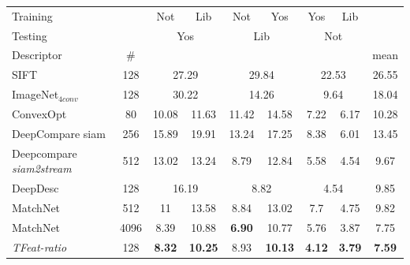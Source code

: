 \begin{table}[ht]
\begin{tabular}{lcccccccc}
\toprule 
    Training& & Not & Lib & Not  & Yos & Yos
  & Lib  & \\
    Testing&  &
                \multicolumn{2}{c}{Yos} & \multicolumn{2}{c}{Lib} & \multicolumn{2}{c}{Not} \\
    \midrule
    Descriptor & \# & & & & & & &mean  \\
    \midrule
    {\small SIFT} \cite{Lowe:2004:DIF:993451.996342} & 128 & \multicolumn{2}{c}{27.29} & \multicolumn{2}{c}{29.84}
                                    & \multicolumn{2}{c}{22.53} &
                                                                  26.55
  \\
   {\small ImageNet$_{4conv}$} \cite{FDB14} & 128 & \multicolumn{2}{c}{30.22} & \multicolumn{2}{c}{14.26}
                                    & \multicolumn{2}{c}{9.64} & 18.04
                                                                   \\
    {\small ConvexOpt} \cite{simonyan2014learning} & 80 & 10.08 & 11.63
                                    & 11.42 & 14.58 & 7.22 & 6.17 &
                                                                    10.28
  \\
     {\small DeepCompare} {\scriptsize siam} \cite{ZagoruykoCVPR2015}& 256 &
                                 15.89                                     
                          & 19.91 & 13.24 & 17.25 & 8.38 & 6.01 & 13.45 
  \\
      {\small Deepcompare} {\scriptsize {\it siam2stream}}& 512 & 13.02
                          & 13.24 & 8.79 & 12.84 & 5.58 & 4.54 & 9.67 \\
   {\small DeepDesc} \cite{simo2015deepdesc} & 128 & \multicolumn{2}{c}{16.19} & \multicolumn{2}{c}{8.82}
                                    & \multicolumn{2}{c}{4.54} & 9.85
                                                                   \\
    {\small MatchNet} \cite{Han_2015_CVPR} & 512 & 11 & 13.58
                                    & 8.84 & 13.02 & 7.7 & 4.75 & 9.82\\
    {\small MatchNet} \cite{Han_2015_CVPR} & 4096 & 8.39 & 10.88
                                    &
                                      \bf 6.90 & 10.77 & 5.76 & 3.87 & 7.75\\
 {\em TFeat-ratio} &  128 & \bf 8.32 & \bf 10.25 &  8.93 & \bf 10.13  & \bf 4.12  &  \bf 3.79 & \bf 7.59  \\

\end{tabular}
\end{table}
